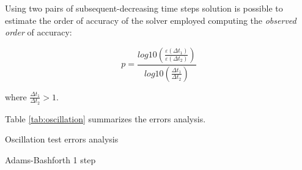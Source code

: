 \documentclass[pdftex,preprint,3p,times,numbers]{elsarticle}
\begin{document}
Using two pairs of subsequent-decreasing time steps solution is possible to estimate the order of accuracy of the solver employed computing the \emph{observed order} of accuracy:

\begin{equation}
  p = \frac{log10 \left( \frac{\varepsilon (\Delta t_1)}{\varepsilon (\Delta t_2)} \right)}{log10 \left( \frac{\Delta t_1}{\Delta t_2} \right)}
\label{eq:oscillation-observed-order}
\end{equation}

where $\frac{\Delta t_1}{\Delta t_2}>1$.

Table \ref{tab:oscillation} summarizes the errors analysis.

\begin{table}[!ht]
  \centering
  \caption{Oscillation test errors analysis}\label{tab:oscillation}
  \begin{subtable}[b]{0.45\textwidth}
    \centering
    \caption{Adams-Bashforth 1 step}\label{tab:oscillation-ab-1}
  \end{subtable}\quad%
  \begin{subtable}[b]{0.45\textwidth}
    \centering
    \caption{Adams-Bashforth 2 steps}\label{tab:oscillation-ab-2}
\end{subtable}
\end{table}
\end{document}
